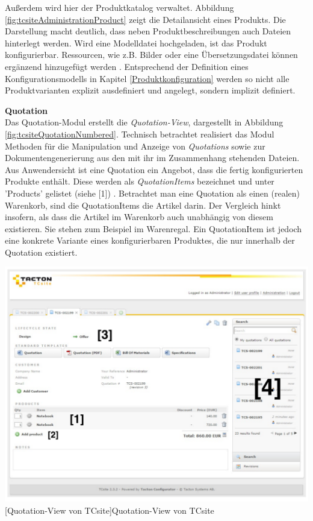 \documentclass[11pt, a4paper, titlepage, listof=totoc, bibliography=totoc, index=totoc, twoside, openright, headings=normal, draft]{scrreprt}
\begin{document}
Außerdem wird hier der Produktkatalog verwaltet. Abbildung \ref{fig:tcsiteAdministrationProduct} zeigt die Detailansicht eines Produkts. Die Darstellung macht deutlich, dass neben Produktbeschreibungen auch Dateien hinterlegt werden. Wird eine Modelldatei hochgeladen, ist das Produkt konfigurierbar. Ressourcen, wie z.B. Bilder oder eine Übersetzungsdatei können ergänzend hinzugefügt werden \citep{tactonTCsiteReferenceManual}. Entsprechend der Definition eines Konfigurationsmodells in Kapitel \ref{Produktkonfiguration} werden so nicht alle Produktvarianten explizit ausdefiniert und angelegt, sondern implizit definiert.

\textbf{Quotation}\\
Das Quotation-Modul erstellt die \emph{Quotation-View}, dargestellt in Abbildung \ref{fig:tcsiteQuotationNumbered}. Technisch betrachtet realisiert das Modul Methoden für die Manipulation und Anzeige von \emph{Quotations} sowie zur Dokumentengenerierung aus den mit ihr im Zusammenhang stehenden Dateien. Aus Anwendersicht ist eine Quotation ein Angebot, dass die fertig konfigurierten Produkte enthält. Diese werden als \emph{QuotationItems} bezeichnet und unter 'Products' gelistet (siehe [1]) \citep{tactonTCsiteDevelopmentManual}. Betrachtet man eine Quotation als einen (realen) Warenkorb, sind die QuotationItems die Artikel darin. Der Vergleich hinkt insofern, als dass die Artikel im Warenkorb auch unabhängig von diesem existieren. Sie stehen zum Beispiel im Warenregal. Ein QuotationItem ist jedoch eine konkrete Variante eines konfigurierbaren Produktes, die nur innerhalb der Quotation existiert.

\vspace{1em}
\begin{minipage}{\linewidth}
	\centering
	\includegraphics[width=1\linewidth]{Abbildungen/tcsiteQuotationNumbered.pdf}
	[Quotation-View von TCsite]{Quotation-View von TCsite}
	\label{fig:tcsiteQuotationNumbered}
\end{minipage}
\vspace{1em}
\end{document}
